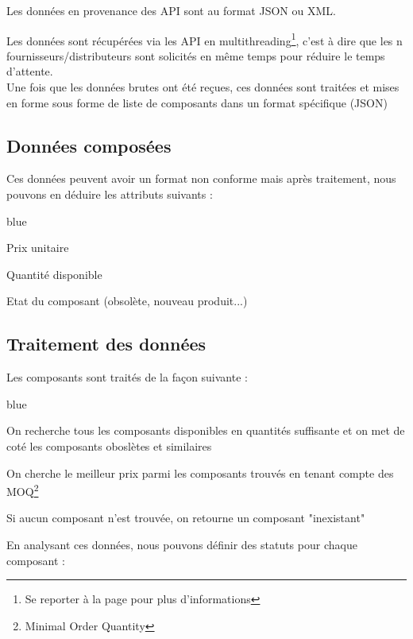 {Les données en provenance des API sont au format JSON ou XML.


Les données sont récupérées via les API en multithreading\footnote{Se reporter à la page \pageref{multithrading} pour plus d'informations}, c'est à dire que les n fournisseurs/distributeurs sont solicités en même temps pour réduire le temps d'attente.\\

Une fois que les données brutes ont été reçues, ces données sont traitées et mises en forme sous forme de liste de composants dans un format spécifique (JSON)


\subsection{Données composées}

Ces données peuvent avoir un format non conforme mais après traitement, nous pouvons en déduire les attributs suivants :\\

\begin{items}{blue}{\Bullet}
\item Prix unitaire
\item Quantité disponible
\item Etat du composant (obsolète, nouveau produit...)
\end{items}


\subsection{Traitement des données}


Les composants sont traités de la façon suivante :

\begin{items}{blue}{\Triangle}
\item On recherche tous les composants disponibles en quantités suffisante et on met de coté les composants oboslètes et similaires
\item On cherche le meilleur prix parmi les composants trouvés en tenant compte des MOQ\footnote{Minimal Order Quantity}
\item Si aucun composant n'est trouvée, on retourne un composant "inexistant"
\end{items}

En analysant ces données, nous pouvons définir des statuts pour chaque composant : 

}
